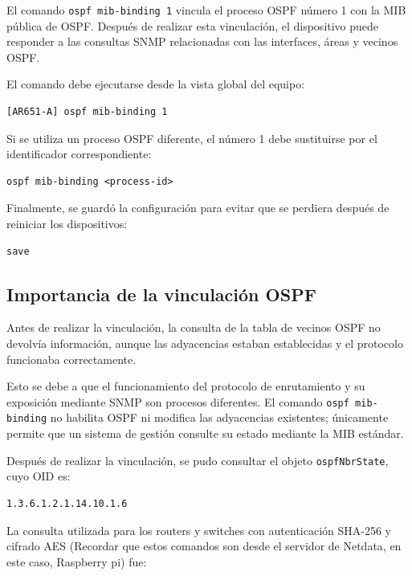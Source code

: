 El comando \texttt{ospf mib-binding 1} vincula el proceso OSPF número 1 con la MIB pública de OSPF. Después de realizar esta vinculación, el dispositivo puede responder a las consultas SNMP relacionadas con las interfaces, áreas y vecinos OSPF.

El comando debe ejecutarse desde la vista global del equipo:

\begin{lstlisting}[style=terminal]
[AR651-A] ospf mib-binding 1
\end{lstlisting}

Si se utiliza un proceso OSPF diferente, el número 1 debe sustituirse por el identificador correspondiente:

\begin{lstlisting}[style=terminal]
ospf mib-binding <process-id>
\end{lstlisting}

Finalmente, se guardó la configuración para evitar que se perdiera después de reiniciar los dispositivos:

\begin{lstlisting}[style=terminal]
save
\end{lstlisting}

\subsection{Importancia de la vinculación OSPF}

Antes de realizar la vinculación, la consulta de la tabla de vecinos OSPF no devolvía información, aunque las adyacencias estaban establecidas y el protocolo funcionaba correctamente.

Esto se debe a que el funcionamiento del protocolo de enrutamiento y su exposición mediante SNMP son procesos diferentes. El comando \texttt{ospf mib-binding} no habilita OSPF ni modifica las adyacencias existentes; únicamente permite que un sistema de gestión consulte su estado mediante la MIB estándar.

Después de realizar la vinculación, se pudo consultar el objeto \texttt{ospfNbrState}, cuyo OID es:

\begin{lstlisting}[style=terminal]
1.3.6.1.2.1.14.10.1.6
\end{lstlisting}

La consulta utilizada para los routers y switches con autenticación SHA-256 y cifrado AES (Recordar que estos comandos son desde el servidor de Netdata, en este caso, Raspberry pi) fue:


